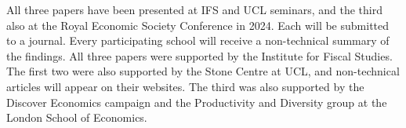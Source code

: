 All three papers have been presented at IFS and UCL seminars, and the third
also at the Royal Economic Society Conference in 2024. Each will be
submitted to a journal. Every participating school will receive a
non-technical summary of the findings. All three
papers were supported by the Institute for Fiscal Studies. The first two
were also supported by the Stone Centre at UCL, and non-technical articles
will appear on their websites. The third was also supported by the Discover
Economics campaign and the Productivity and Diversity group at the London
School of Economics.
